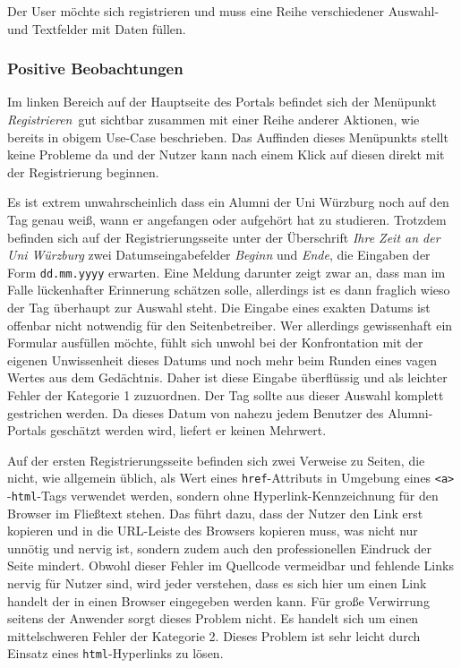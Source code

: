 \newpage
{}\label{usecse:reg}
Der User möchte sich registrieren und muss eine Reihe verschiedener Auswahl- und Textfelder mit Daten füllen.

\subsubsection*{Positive Beobachtungen} 
Im linken Bereich auf der Hauptseite des Portals befindet sich der Menüpunkt \emph{ Registrieren}~gut sichtbar zusammen mit einer Reihe anderer Aktionen, wie bereits in obigem Use-Case beschrieben. Das Auffinden dieses Menüpunkts stellt keine Probleme da und der Nutzer kann nach einem Klick auf diesen direkt mit der Registrierung
beginnen.




{ Es ist extrem unwahrscheinlich dass ein Alumni der Uni Würzburg noch auf den Tag genau weiß, wann er angefangen oder aufgehört hat zu studieren. Trotzdem befinden sich auf
der Registrierungsseite unter der Überschrift \emph{Ihre Zeit an der Uni Würzburg} zwei Datumseingabefelder \emph{Beginn} und \emph{Ende}, die Eingaben der Form \texttt{dd.mm.yyyy} erwarten.
}
{
Eine Meldung darunter zeigt zwar an, dass man im Falle lückenhafter Erinnerung schätzen solle, allerdings ist es dann fraglich wieso der Tag überhaupt zur Auswahl steht. Die Eingabe eines exakten Datums ist offenbar nicht notwendig für den Seitenbetreiber. Wer allerdings gewissenhaft ein Formular ausfüllen möchte, fühlt sich unwohl bei der Konfrontation mit der eigenen Unwissenheit dieses Datums und noch mehr beim Runden eines vagen Wertes aus dem Gedächtnis. Daher ist diese Eingabe überflüssig und als leichter Fehler der Kategorie 1 zuzuordnen.
}
{ Der Tag sollte aus dieser Auswahl komplett gestrichen werden. Da dieses Datum von nahezu jedem Benutzer des Alumni-Portals geschätzt werden wird, liefert er keinen Mehrwert.
} 
\label{prob:reg:wtfday}

{ Auf der ersten Registrierungsseite befinden sich zwei Verweise zu Seiten, die nicht, wie allgemein üblich, als Wert eines \texttt{href}-Attributs in Umgebung eines \texttt{\textless a\textgreater} -\texttt{html}-Tags verwendet werden, sondern ohne Hyperlink-Kennzeichnung für den Browser im Fließtext stehen. Das führt dazu, dass der Nutzer den Link erst kopieren und in die URL-Leiste des Browsers kopieren muss, was nicht nur unnötig und nervig ist, sondern zudem auch den professionellen Eindruck der Seite mindert.
}
{ Obwohl dieser Fehler im Quellcode vermeidbar und fehlende Links nervig für Nutzer sind, wird jeder verstehen, dass es sich hier um einen Link handelt der in einen Browser eingegeben werden kann. Für große Verwirrung seitens der Anwender sorgt dieses Problem nicht. Es handelt sich um einen mittelschweren Fehler der Kategorie 2.
}
{ Dieses Problem ist sehr leicht durch Einsatz eines \texttt{html}-Hyperlinks zu lösen.
} 
\label{prob:reg:hyperhyper}

